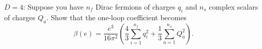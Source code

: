 \begin{problem}
    \(D=4\): Suppose you have \(n_f\) Dirac fermions of charges \(q_i\) and \(n_s\) complex scalars of charges \(Q_a\). Show that the one-loop coefficient becomes
    \[
        \beta(e)=\frac{e^3}{16\pi^2}\left(\frac{4}{3}\sum_{i=1}^{n_f}q_i^2+\frac{1}{3}\sum_{a=1}^{n_s}Q_a^2\right).
    \]
\end{problem}
